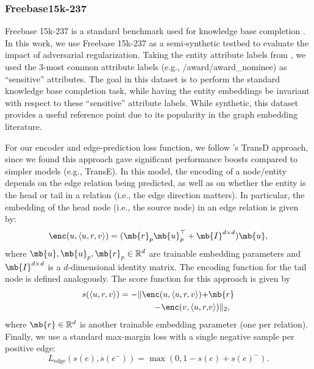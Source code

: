 \subsubsection*{Freebase15k-237}
\vspace{-2mm}
Freebase 15k-237 is a standard benchmark used for knowledge base completion \cite{toutanova2015representing}.
In this work, we use Freebase 15k-237 as a semi-synthetic testbed to evaluate the impact of adversarial regularization. 
Taking the entity attribute labels from \citet{moon2017learning}, we used the $3$-most common attribute labels (e.g., /award/award\_nominee) as ``sensitive'' attributes.
The goal in this dataset is to perform the standard knowledge base completion task, while having the entity embeddings be invariant with respect to these ``sensitive'' attribute labels.
While synthetic, this dataset provides a useful reference point due to its popularity in the graph embedding literature. 

For our encoder and edge-prediction loss function, we follow \citet{ji2015knowledge}'s TransD approach, since we found this approach gave significant performance boosts compared to simpler models (e.g., TransE). 
In this model, the encoding of a node/entity depends on the edge relation being predicted, as well as on whether the entity is the head or tail in a relation (i.e., the edge direction matters).
In particular, the embedding of the head node (i.e., the source node) in an edge relation is given by:
\begin{equation}
    \enc(u, \langle u, r, v \rangle) = (\mb{r}_p\mb{u}_p^\top + \mb{I}^{d \times d})\mb{u},
\end{equation}
where $\mb{u}, \mb{u}_p, \mb{r}_p \in \mathbb{R}^d$ are trainable embedding parameters and $\mb{I}^{d\times d}$ is a $d$-dimensional identity matrix. 
The encoding function for the tail node is defined analogously. 
The score function for this approach is given by
\begin{align*}\label{eq:transd}
s(\langle u, r, v \rangle) = -\|\enc(u, \langle u, r, v \rangle) + &\mb{r} \\ - \enc(v, \langle u, r,& v \rangle)\|_2,
\end{align*}
where $\mb{r} \in \mathbb{R}^d$ is another trainable embedding parameter (one per relation). 
Finally, we use a standard max-margin loss with a single negative sample per positive edge:
\begin{equation}\label{eq:margin}
    L_{\textrm{edge}}(s(e), s(e^-)) = \max(0, 1 - s(e) + s(e)^-).
\end{equation}
